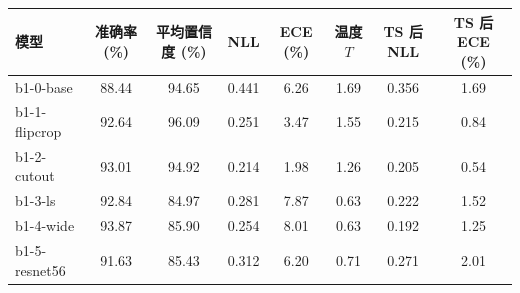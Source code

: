 \begin{tabular}{lccccccc}
\toprule
模型 & 准确率 (\%) & 平均置信度 (\%) & NLL & ECE (\%) & 温度 $T$ & TS 后 NLL & TS 后 ECE (\%) \\
\midrule
b1-0-base & 88.44 & 94.65 & 0.441 & 6.26 & 1.69 & 0.356 & 1.69 \\
b1-1-flipcrop & 92.64 & 96.09 & 0.251 & 3.47 & 1.55 & 0.215 & 0.84 \\
b1-2-cutout & 93.01 & 94.92 & 0.214 & 1.98 & 1.26 & 0.205 & 0.54 \\
b1-3-ls & 92.84 & 84.97 & 0.281 & 7.87 & 0.63 & 0.222 & 1.52 \\
b1-4-wide & 93.87 & 85.90 & 0.254 & 8.01 & 0.63 & 0.192 & 1.25 \\
b1-5-resnet56 & 91.63 & 85.43 & 0.312 & 6.20 & 0.71 & 0.271 & 2.01 \\
\bottomrule
\end{tabular}
